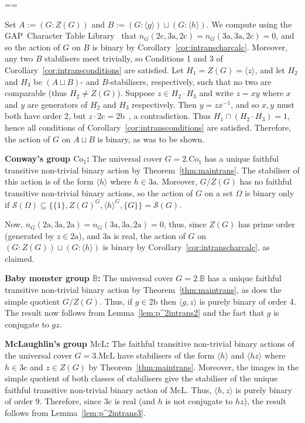 \documentclass[11pt, a4paper]{amsart}
\makeatletter
\newcommand{\gap}{{\sf GAP}}
\renewcommand{\proofname}{Proof}
\renewenvironment{proof}[1][\proofname]{\par
  \pushQED{\qed}  \normalfont \partopsep=\z@skip \topsep=\z@skip
  \trivlist
  \item[\hskip\labelsep
        \scshape
    #1\@addpunct{.}]\ignorespaces
}{  \popQED\endtrivlist\@endpefalse
}
\makeatother
\begin{document}
\begin{proof}[Proof of Theorem~\ref{thm:main}]
    Set $A:=(G:Z(G))$ and $B:=(G:\langle g\rangle)\sqcup (G:\langle h\rangle)$. We compute using the \gap~Character Table Library~\cite{CTblLib1.3.11} that $n_G(\mathrm{2c},\mathrm{3a},\mathrm{2c})=n_G(\mathrm{3a},\mathrm{3a},\mathrm{2c})=0$, and so the action of $G$ on $B$ is binary by Corollary~\ref{cor:intranscharcalc}. Moreover, any two $B$ stabilisers meet trivially, so Conditions 1 and 3 of Corollary~\ref{cor:intransconditions} are satisfied. Let $H_1= Z(G)=\langle z\rangle$, and let $H_2$ and $H_3$ be $(A\sqcup B)$- and $B$-stabilisers, respectively, such that no two are comparable (thus $H_2\ne Z(G)$). Suppose $z\in H_2\cdot H_3$ and write $z=xy$ where $x$ and $y$ are generators of $H_2$ and $H_3$ respectively. Then $y=zx^{-1}$, and so $x,y$ must both have order 2, but $z\cdot\mathrm{2c}=\mathrm{2b}$~\cite{atlas}, a contradiction. Thus $H_1\cap (H_2\cdot H_3)=1$, hence all conditions of Corollary~\ref{cor:intransconditions} are satisfied. Therefore, the action of $G$ on $A\sqcup B$ is binary, as was to be shown.

    \textbf{Conway's group $\mathrm{Co}_1$:} The universal cover $G=2.\mathrm{Co}_1$ has a unique faithful transitive non-trivial binary action by Theorem~\ref{thm:maintrans}. The stabiliser of this action is of the form $\langle h\rangle$ where $h\in\mathrm{3a}$. Moreover, $G/Z(G)$ has no faithful transitive non-trivial binary actions, so the action of $G$ on a set $\Omega$ is binary only if $\mathcal{S}(\Omega)\subseteq\{\{1\},Z(G)^G,\langle h\rangle^G,\{G\}\}=\mathcal{S}(G)$. 

    Now, $n_G(\mathrm{2a,3a,2a})=n_G(\mathrm{3a,3a,2a})=0$,
    thus, since $Z(G)$ has prime order (generated by $z\in \mathrm{2a}$), and $\mathrm{3a}$ is real, the action of $G$ on $(G:Z(G))\sqcup(G:\langle h\rangle)$ is binary by Corollary~\ref{cor:intranscharcalc}, as claimed.

    \textbf{Baby monster group $\mathbb{B}$:} The universal cover $G=2.\mathbb{B}$ has a unique faithful transitive non-trivial binary action by Theorem~\ref{thm:maintrans}, as does the simple quotient $G/Z(G)$. Thus, if $g\in\mathrm{2b}$ then $\langle g,z\rangle$ is purely binary of order 4. The result now follows from  Lemma~\ref{lem:p^2intrans2} and the fact that $g$ is conjugate to $gz$.
    
    \textbf{McLaughlin's group $\mathrm{McL}$:} The faithful transitive non-trivial binary actions of the universal cover $G=3.\mathrm{McL}$ have stabilisers of the form $\langle h\rangle$ and $\langle hz\rangle$ where $h\in\mathrm{3c}$ and $ z\in Z(G)$ by Theorem~\ref{thm:maintrans}. Moreover, the images in the simple quotient of both classes of stabilisers give the stabiliser of the unique faithful transitive non-trivial binary action of $\mathrm{McL}$. Thus, $\langle h,z\rangle$ is purely binary of order 9. Therefore, since $\mathrm{3c}$ is real (and $h$ is not conjugate to $hz$), the result follows from  Lemma~\ref{lem:p^2intrans3}.
    

\end{proof}
\end{document}
